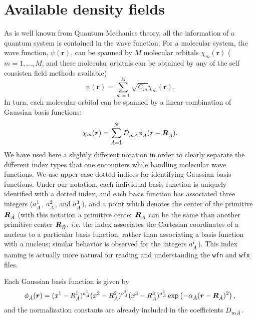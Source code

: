 \chapter{Available density fields}\label{sec:availablefields}

As is well known from Quantum Mechanics theory, all the information of a quantum system is contained in the wave function. For a molecular system,  the wave function, $\psi(\boldsymbol{r})$, can be spanned by $M$ molecular orbitals $\chi_m(\boldsymbol{r})$ ($m=1,\dots,M$, and these molecular orbitals can be obtained by any of the self consisten field methods available)
%
\begin{equation}
   \psi(\boldsymbol{r})=\sum_{m=1}^{M}\sqrt{C_m}\chi_m(\boldsymbol{r}).
\end{equation}
%
In turn, each molecular orbital can be spanned by a linear combination of Gaussian basis functions:
\begin{equation}
   \chi_m(\boldsymbol{r})=\sum_{\dot{A}=\dot{1}}^{\dot{N}}D_{m\dot{A}}\phi_{\dot{A}}(\boldsymbol{r}-\boldsymbol{R}_{\dot{A}}).
\end{equation}
%
We have used here a slightly different notation in order to clearly separate the different index types that one encounters while handling molecular wave functions. We use upper case dotted indices for identifying Gaussian basis functions. Under our notation, each individual basis function is uniquely identified with a dotted index, and each basis function has associated three integers ($a^1_{\dot{A}}$, $a^2_{\dot{A}}$, and $a^3_{\dot{A}}$), and a point which denotes the center of the primitive $\boldsymbol{R}_{\dot{A}}$ (with this notation a primitive center $\boldsymbol{R}_{\dot{A}}$ can be the same than another primitive center $\boldsymbol{R}_{\dot{B}}$, \textit{i.e.} the index associates the Cartesian coordinates of a nucleus to a particular basis function, rather than associating a basis function with a nucleus; similar behavior is observed for the integers $a^i_{\dot{A}}$). This index naming is actually more natural for reading and understanding the \texttt{wfn} and \texttt{wfx} files. 

Each Gaussian basis function is given by
%
\begin{equation}
   \phi_{\dot{A}}(\boldsymbol{r})=(x^1-R^1_{\dot{A}})^{a^1_{\dot{A}}}(x^2-R^2_{\dot{A}})^{a^2_{\dot{A}}}(x^3-R^3_{\dot{A}})^{a^3_{\dot{A}}}
   \exp\left(-\alpha_{\dot{A}}(\boldsymbol{r}-\boldsymbol{R}_{\dot{A}})^2\right),
\end{equation}
%
and the normalization constants are already included in the coefficients $D_{m\dot{A}}$.

